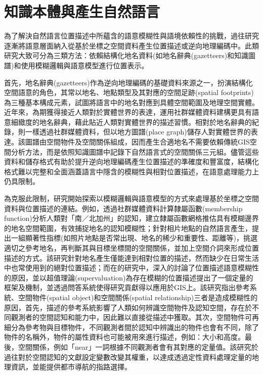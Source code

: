\section{知識本體與產生自然語言}

為了解決自然語言位置描述中所蘊含的語意模糊性與語境依賴性的挑戰，過往研究逐漸將語意層面納入從基於坐標之空間資料產生位置描述或逆向地理編碼中。此類研究大致可分為三類方法：依賴結構化地名資料(如地名辭典(gazetteers)和知識圖譜)和使用模糊邏輯與語意模型進行位置表示。

首先，地名辭典(gazetteers)作為逆向地理編碼的基礎資料來源之一，扮演結構化空間語意的角色，其常以地名、地點類型及其對應的空間足跡(spatial footprints)為三種基本構成元素\citep{RN122, RN159, RN31}，試圖將語言中的地名對應到具體空間範圍及地理空間實體。近年來，為期獲得接近人類對於實體世界的表達，運用社群媒體資料建構更具有語意細緻度的地名辭典，藉此貼近人類對實體世界的描述習慣\citep{RN31}。相對於地名辭典的紀錄，\citet{RN23}則一樣透過社群媒體資料，但以地方圖譜(place graph)儲存人對實體世界的表達。該圖譜由空間物件及空間關係組成，因而產生合適地名不需要依賴傳統GIS空間分析方法，而是依照知識圖譜中記錄下自然語言式的空間關係三元組。儘管這些資料和儲存格式有助於提升逆向地理編碼產生位置描述的準確度和豐富度，結構化格式難以完整和全面涵蓋語言中隱含的模糊性與相對位置描述，在語意處理能力上仍具限制。

為克服此限制，研究開始探索以模糊邏輯與語意模型的方式來處理基於坐標之空間資料與位置描述的連結。例如，\citet{RN133}透過社群媒體資料計算隸屬函數(membership function)分析人類對「南／北加州」的認知，建立隸屬函數網格推估具有模糊邊界的地名空間範圍，有效捕捉地名的認知模糊性；\citet{RN164}針對相片地點的自然語言產生，提出一組顯著性指標(如照片地點是否常出現、地名的稀少和重要性、距離等)，挑選適切之參考地名，再判斷其與目標坐標間的空間關係，並加上空間介詞來形成位置描述的方式。該研究針對地名產生僅能達到相對位置的描述，然而缺少在日常生活中也常使用到的絕對位置描述；而在\citet{RN128}的研究中，深入的討論了位置描述語意模糊性的原因，並以超值理論(supervaluation)為存在模糊的位置描述提出了一個定量的框架及機制，並透過問答系統使得研究貢獻得以應用於GIS上。該研究指出參考系統、空間物件(spatial object)和空間關係(spatial relationship)三者是造成模糊性的原因，首先，描述的參考系統影響了人類如何辨識空間物件及認知空間，存在於不同觀測者的空間認知和能力中，因此難以直接從描述中獲取。其次，空間物件可再細分為參考物與目標物件，不同觀測者間於認知中辨識出的物件也會有不同，除了物件的名稱外，物件的屬性資料也可能被用來進行描述，例如：大小和高度。最後，空間關係，例如「near」一詞根據不同觀測者會有其對應的定量值。該研究於過往對於空間認知的文獻設定變數改變其權重，以達成透過定性資料處理定量的地理資訊，並能提供都市導航的指路選擇。

